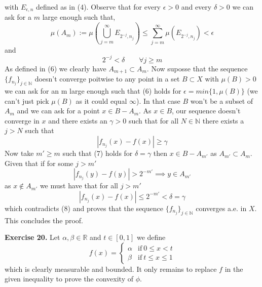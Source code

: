 \documentclass{article}
\begin{document}
    with $E_{\epsilon,n}$ defined as in (4). Observe that for every $\epsilon > 0$ and every $\delta > 0$ we can ask for a $m$ large enough such that,
    \begin{equation}
        \mu \left( A_m \right) := \mu \left( \bigcup_{j = m}^{\infty} E_{2^{-j},n_j }\right) \le \sum_{j=m}^{\infty} \mu \left( E_{2^{-j},n_j} \right) < \epsilon 
    \end{equation}
    and
    \begin{equation}
        2^{-j} < \delta \qquad \forall j \ge m
    \end{equation}
    As defined in (6) we clearly have $A_{m+1} \subset A_m$. Now suposse that the sequence $\{f_{n_j}\}_{j \in \mathbb{N}}$ doesn't converge poitwise to any point in a set $B \subset X$ with $\mu \left( B \right) > 0$ we can ask for an m large enough such that (6) holds for $\epsilon = min\{1, \mu \left( B \right)\}$ (we can't just pick $\mu \left( B \right) $ as it could equal $\infty$). In that case $B$ won't be a subset of $A_m$ and we can ask for a point $x \in B - A_m$. As $x \in B$, our sequence doesn't converge in $x$ and there exists an $\gamma > 0$ such that for all $N \in \mathbb{N}$ there exists a $j > N$ such that
    \begin{equation}
        |f_{n_j} \left( x \right) - f \left( x \right) | \ge  \gamma
    \end{equation}
    Now take $m' \ge m$ such that (7) holds for $\delta = \gamma$ then $x \in B-A_{m'}$  as $A_{m'} \subset A_m$. Given that if for some $j>m'$
    \[
        |f_{n_j} \left( y \right) - f \left( y \right) | > 2^{-m'} \implies y \in A_{m'} 
    \]
    as $x \notin A_{m'}$ we must have that for all $j>m'$
    \[
        |f_{n_j} \left( x \right) - f \left( x \right) | \le 2^{-m'} < \delta = \gamma
    \]
    which contradicts (8) and proves that the sequence $\{f_{n_j}\}_{j \in \mathbb{N}}$ converges a.e. in $X$. This concludes the proof.
\bigbreak

\begin{exercise}\textbf{Exercise 20.}
    Let $\alpha, \beta \in \mathbb{R}$ and $t \in [0,1]$ we define 
    \[
        f \left( x \right) =
        \begin{cases}
            \alpha & \text{if}\ 0 \le x < t \\
            \beta & \text{if}\ t \le x \le 1
        \end{cases}
    \]
    which is clearly measurable and bounded. It only remains to replace $f$ in the given inequality to prove the convexity of $\phi$.
\end{exercise}
\end{document}
